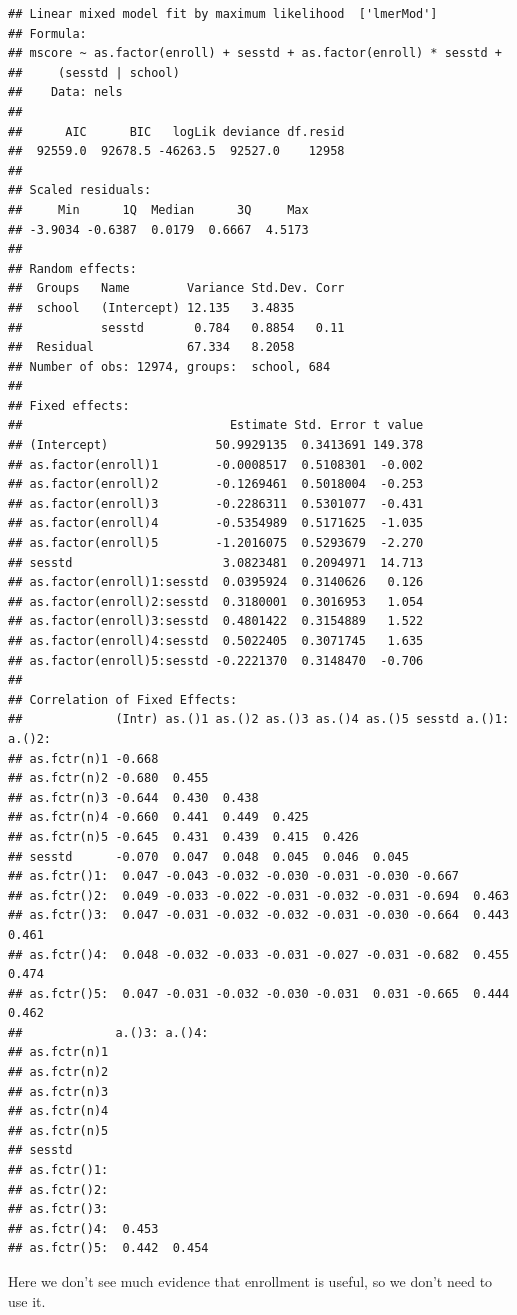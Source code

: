 \documentclass[ignorenonframetext,]{beamer}
\begin{document}
\begin{frame}[fragile]{}
\begin{verbatim}
## Linear mixed model fit by maximum likelihood  ['lmerMod']
## Formula: 
## mscore ~ as.factor(enroll) + sesstd + as.factor(enroll) * sesstd +  
##     (sesstd | school)
##    Data: nels
## 
##      AIC      BIC   logLik deviance df.resid 
##  92559.0  92678.5 -46263.5  92527.0    12958 
## 
## Scaled residuals: 
##     Min      1Q  Median      3Q     Max 
## -3.9034 -0.6387  0.0179  0.6667  4.5173 
## 
## Random effects:
##  Groups   Name        Variance Std.Dev. Corr
##  school   (Intercept) 12.135   3.4835       
##           sesstd       0.784   0.8854   0.11
##  Residual             67.334   8.2058       
## Number of obs: 12974, groups:  school, 684
## 
## Fixed effects:
##                             Estimate Std. Error t value
## (Intercept)               50.9929135  0.3413691 149.378
## as.factor(enroll)1        -0.0008517  0.5108301  -0.002
## as.factor(enroll)2        -0.1269461  0.5018004  -0.253
## as.factor(enroll)3        -0.2286311  0.5301077  -0.431
## as.factor(enroll)4        -0.5354989  0.5171625  -1.035
## as.factor(enroll)5        -1.2016075  0.5293679  -2.270
## sesstd                     3.0823481  0.2094971  14.713
## as.factor(enroll)1:sesstd  0.0395924  0.3140626   0.126
## as.factor(enroll)2:sesstd  0.3180001  0.3016953   1.054
## as.factor(enroll)3:sesstd  0.4801422  0.3154889   1.522
## as.factor(enroll)4:sesstd  0.5022405  0.3071745   1.635
## as.factor(enroll)5:sesstd -0.2221370  0.3148470  -0.706
## 
## Correlation of Fixed Effects:
##             (Intr) as.()1 as.()2 as.()3 as.()4 as.()5 sesstd a.()1: a.()2:
## as.fctr(n)1 -0.668                                                        
## as.fctr(n)2 -0.680  0.455                                                 
## as.fctr(n)3 -0.644  0.430  0.438                                          
## as.fctr(n)4 -0.660  0.441  0.449  0.425                                   
## as.fctr(n)5 -0.645  0.431  0.439  0.415  0.426                            
## sesstd      -0.070  0.047  0.048  0.045  0.046  0.045                     
## as.fctr()1:  0.047 -0.043 -0.032 -0.030 -0.031 -0.030 -0.667              
## as.fctr()2:  0.049 -0.033 -0.022 -0.031 -0.032 -0.031 -0.694  0.463       
## as.fctr()3:  0.047 -0.031 -0.032 -0.032 -0.031 -0.030 -0.664  0.443  0.461
## as.fctr()4:  0.048 -0.032 -0.033 -0.031 -0.027 -0.031 -0.682  0.455  0.474
## as.fctr()5:  0.047 -0.031 -0.032 -0.030 -0.031  0.031 -0.665  0.444  0.462
##             a.()3: a.()4:
## as.fctr(n)1              
## as.fctr(n)2              
## as.fctr(n)3              
## as.fctr(n)4              
## as.fctr(n)5              
## sesstd                   
## as.fctr()1:              
## as.fctr()2:              
## as.fctr()3:              
## as.fctr()4:  0.453       
## as.fctr()5:  0.442  0.454
\end{verbatim}

Here we don't see much evidence that enrollment is useful, so we don't
need to use it.

\end{frame}
\end{document}
